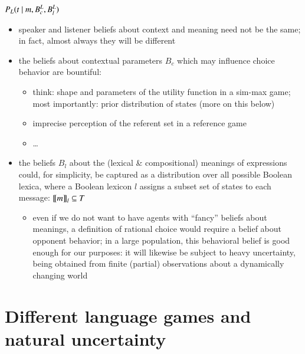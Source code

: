 \documentclass[fleqn,reqno,10pt]{article}
\begin{document}
\begin{itemize}
\begin{itemize}
    $P_L(t \mid m, B^L_c, B^L_l)$
    \begin{itemize}
    \item speaker and listener beliefs about context and meaning need not be the same; in fact,
      almost always they will be different
    \item the beliefs about contextual parameters $B_c$ which may influence choice behavior are
      bountiful:
      \begin{itemize}
      \item think: shape and parameters of the utility function in a sim-max game; most
        importantly: prior distribution of states (more on this below)
      \item imprecise perception of the referent set in a reference game
      \item \dots
      \end{itemize}
    \item the beliefs $B_l$ about the (lexical \& compositional) meanings of expressions could,
      for simplicity, be captured as a distribution over all possible Boolean lexica, where a
      Boolean lexicon $l$ assigns a subset set of states to each message: $\left [\! \left [ m \right ]\! \right]_l
      \subseteq T$
      \begin{itemize}
      \item even if we do not want to have agents with ``fancy'' beliefs about meanings, a
        definition of rational choice would require a belief about opponent behavior; in a
        large population, this behavioral belief is good enough for our purposes: it will
        likewise be subject to heavy uncertainty, being obtained from finite (partial)
        observations about a dynamically changing world
      \end{itemize}

    \end{itemize}
  \end{itemize}
\end{itemize}

\section*{Different language games and natural uncertainty}
\end{document}
